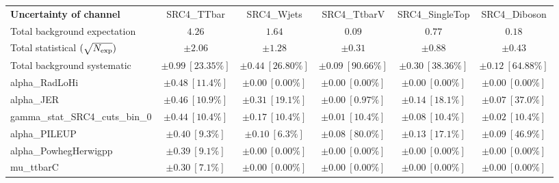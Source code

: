 
\begin{sidewaystable}
\begin{center}
\setlength{\tabcolsep}{0.0pc}
\begin{tabular*}{\textwidth}{@{\extracolsep{\fill}}lccccc}
\noalign{\smallskip}\hline\noalign{\smallskip}
{\bf Uncertainty of channel}                                    & SRC4\_TTbar            & SRC4\_Wjets            & SRC4\_TtbarV            & SRC4\_SingleTop            & SRC4\_Diboson            \\
\noalign{\smallskip}\hline\noalign{\smallskip}
Total background expectation             &  $4.26$        &  $1.64$        &  $0.09$        &  $0.77$        &  $0.18$       \\
\noalign{\smallskip}\hline\noalign{\smallskip}
Total statistical $(\sqrt{N_{\rm exp}})$              & $\pm 2.06$        & $\pm 1.28$        & $\pm 0.31$        & $\pm 0.88$        & $\pm 0.43$       \\
Total background systematic               & $\pm 0.99\ [23.35\%] $        & $\pm 0.44\ [26.80\%] $        & $\pm 0.09\ [90.66\%] $        & $\pm 0.30\ [38.36\%] $        & $\pm 0.12\ [64.88\%] $             \\
\noalign{\smallskip}\hline\noalign{\smallskip}
\noalign{\smallskip}\hline\noalign{\smallskip}
alpha\_RadLoHi         & $\pm 0.48\ [11.4\%] $          & $\pm 0.00\ [0.00\%] $          & $\pm 0.00\ [0.00\%] $          & $\pm 0.00\ [0.00\%] $          & $\pm 0.00\ [0.00\%] $       \\
alpha\_JER         & $\pm 0.46\ [10.9\%] $          & $\pm 0.31\ [19.1\%] $          & $\pm 0.00\ [0.97\%] $          & $\pm 0.14\ [18.1\%] $          & $\pm 0.07\ [37.0\%] $       \\
gamma\_stat\_SRC4\_cuts\_bin\_0         & $\pm 0.44\ [10.4\%] $          & $\pm 0.17\ [10.4\%] $          & $\pm 0.01\ [10.4\%] $          & $\pm 0.08\ [10.4\%] $          & $\pm 0.02\ [10.4\%] $       \\
alpha\_PILEUP         & $\pm 0.40\ [9.3\%] $          & $\pm 0.10\ [6.3\%] $          & $\pm 0.08\ [80.0\%] $          & $\pm 0.13\ [17.1\%] $          & $\pm 0.09\ [46.9\%] $       \\
alpha\_PowhegHerwigpp         & $\pm 0.39\ [9.1\%] $          & $\pm 0.00\ [0.00\%] $          & $\pm 0.00\ [0.00\%] $          & $\pm 0.00\ [0.00\%] $          & $\pm 0.00\ [0.00\%] $       \\
mu\_ttbarC         & $\pm 0.30\ [7.1\%] $          & $\pm 0.00\ [0.00\%] $          & $\pm 0.00\ [0.00\%] $          & $\pm 0.00\ [0.00\%] $          & $\pm 0.00\ [0.00\%] $       \\

\end{tabular*}
\end{center}
\end{sidewaystable}
